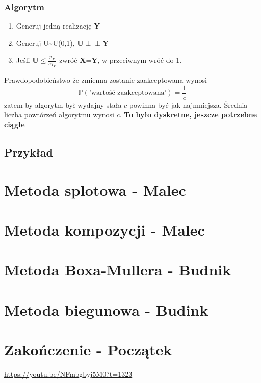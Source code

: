 \documentclass[12pt]{mwrep}
\newcommand{\indep}{\perp \!\!\! \perp}
\begin{document}
	\subsubsection{Algorytm}
	\begin{enumerate}[leftmargin=10mm]
		\item Generuj jedną realizację \textbf{Y}
		\item Generuj U\textasciitilde U(0,1), $\textbf{U}\boldsymbol{\indep} \textbf{Y}$
		\item Jeśli $\textbf{U}\leqslant\frac{p_\textbf{Y}}{cq_\textbf{Y}}$ zwróć \textbf{X}=\textbf{Y}, w przeciwnym wróć do 1.
	\end{enumerate}
	Prawdopodobieństwo że zmienna zostanie zaakceptowana wynosi
	$$\mathbb{P}(\text{'wartość zaakceptowana'})=\frac{1}{c}$$
	zatem by algorytm był wydajny stała $c$ powinna być jak najmniejsza. Średnia liczba powtórzeń algorytmu wynosi $c$.
	\textbf{To było dyskretne, jeszcze potrzebne ciągłe}
	
	\subsection{Przykład}


	
	\section{Metoda splotowa - Malec}
	
	\section{Metoda kompozycji - Malec}




	
	\section{Metoda Boxa-Mullera - Budnik}
	
	\section{Metoda biegunowa - Budink}



	
	\section{Zakończenie - Początek}
	
	
	\begin{thebibliography}{1}
		\url{https://youtu.be/NFmbgbyj5M0?t=1323}

	\end{thebibliography}
	
\end{document}
